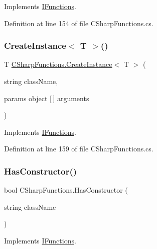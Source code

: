 Implements \hyperlink{interface_i_functions_a7578bf930745a057a9e24f6048858fe2}{I\+Functions}.



Definition at line 154 of file C\+Sharp\+Functions.\+cs.

\mbox{\label{class_c_sharp_functions_a9571709a7b9247f42ebf27cac0286751}} 
\subsubsection{\texorpdfstring{Create\+Instance$<$ T $>$()}{CreateInstance< T >()}}
{\footnotesize\ttfamily T \hyperlink{class_c_sharp_functions_ae2a8accaa0f465b627997d145452ec19}{C\+Sharp\+Functions.\+Create\+Instance}$<$ T $>$ (\begin{DoxyParamCaption}\item[{string}]{class\+Name,  }\item[{params object \mbox{[}$\,$\mbox{]}}]{arguments }\end{DoxyParamCaption})}



Implements \hyperlink{interface_i_functions_a5acd536d97990a6d5d575dce8bfff5f1}{I\+Functions}.



Definition at line 159 of file C\+Sharp\+Functions.\+cs.

\mbox{\label{class_c_sharp_functions_a803d561b3e19f9b6420d4afcf5e4c631}} 
\subsubsection{\texorpdfstring{Has\+Constructor()}{HasConstructor()}}
{\footnotesize\ttfamily bool C\+Sharp\+Functions.\+Has\+Constructor (\begin{DoxyParamCaption}\item[{string}]{class\+Name }\end{DoxyParamCaption})}



Implements \hyperlink{interface_i_functions_a41edac00a2af1290932ae95536f987f9}{I\+Functions}.



